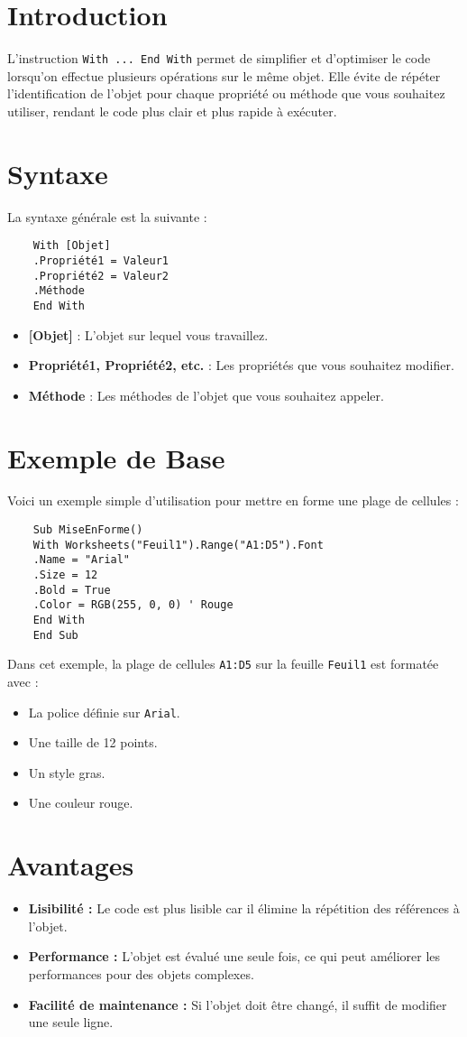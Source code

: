 \documentclass[a4paper,12pt]{report}
\begin{document}
\section{Introduction}
L'instruction \texttt{With ... End With} permet de simplifier et d'optimiser le code lorsqu'on effectue plusieurs opérations sur le même objet. Elle évite de répéter l'identification de l'objet pour chaque propriété ou méthode que vous souhaitez utiliser, rendant le code plus clair et plus rapide à exécuter.

\section{Syntaxe}
La syntaxe générale est la suivante :
\begin{lstlisting}
	With [Objet]
	.Propriété1 = Valeur1
	.Propriété2 = Valeur2
	.Méthode
	End With
\end{lstlisting}
\begin{itemize}
	\item \textbf{[Objet]} : L'objet sur lequel vous travaillez.
	\item \textbf{Propriété1, Propriété2, etc.} : Les propriétés que vous souhaitez modifier.
	\item \textbf{Méthode} : Les méthodes de l'objet que vous souhaitez appeler.
\end{itemize}
\newpage
\section{Exemple de Base}
Voici un exemple simple d'utilisation pour mettre en forme une plage de cellules :
\begin{lstlisting}
	Sub MiseEnForme()
	With Worksheets("Feuil1").Range("A1:D5").Font
	.Name = "Arial"
	.Size = 12
	.Bold = True
	.Color = RGB(255, 0, 0) ' Rouge
	End With
	End Sub
\end{lstlisting}

Dans cet exemple, la plage de cellules \texttt{A1:D5} sur la feuille \texttt{Feuil1} est formatée avec :
\begin{itemize}
	\item La police définie sur \texttt{Arial}.
	\item Une taille de 12 points.
	\item Un style gras.
	\item Une couleur rouge.
\end{itemize}

\section{Avantages}
\begin{itemize}
	\item \textbf{Lisibilité :} Le code est plus lisible car il élimine la répétition des références à l'objet.
	\item \textbf{Performance :} L'objet est évalué une seule fois, ce qui peut améliorer les performances pour des objets complexes.
	\item \textbf{Facilité de maintenance :} Si l'objet doit être changé, il suffit de modifier une seule ligne.
\end{itemize}
\newpage
\end{document}
